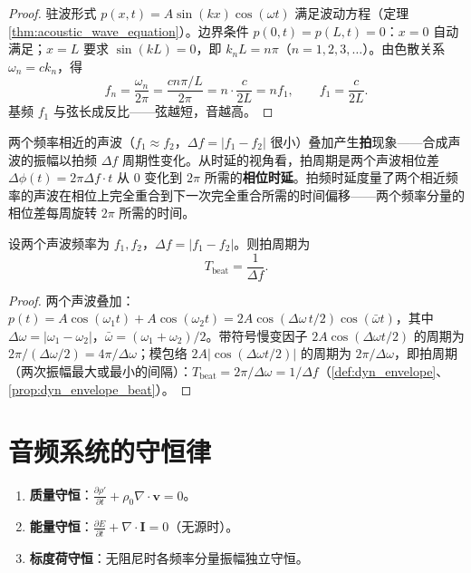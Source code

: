 \begin{proof}
驻波形式 $p(x,t) = A\sin(kx)\cos(\omega t)$ 满足波动方程（定理 \ref{thm:acoustic_wave_equation}）。边界条件 $p(0,t) = p(L,t) = 0$：$x=0$ 自动满足；$x=L$ 要求 $\sin(kL) = 0$，即 $k_n L = n\pi$（$n = 1,2,3,\dots$）。由色散关系 $\omega_n = c k_n$，得
\[
f_n = \frac{\omega_n}{2\pi} = \frac{c n\pi/L}{2\pi} = n\cdot\frac{c}{2L} = n f_1, \qquad f_1 = \frac{c}{2L}.
\]
基频 $f_1$ 与弦长成反比——弦越短，音越高。
\end{proof}

\begin{definition}[拍频时延]\label{def:beat_delay}
两个频率相近的声波（$f_1 \approx f_2$，$\Delta f = |f_1 - f_2|$ 很小）叠加产生\textbf{拍}现象——合成声波的振幅以拍频 $\Delta f$ 周期性变化。从时延的视角看，拍周期是两个声波相位差 $\Delta\phi(t) = 2\pi\Delta f \cdot t$ 从 $0$ 变化到 $2\pi$ 所需的\textbf{相位时延}。拍频时延度量了两个相近频率的声波在相位上完全重合到下一次完全重合所需的时间偏移——两个频率分量的相位差每周旋转 $2\pi$ 所需的时间。
\end{definition}

\begin{proposition}[拍频时延公式]\label{prop:beat_delay_formula}
设两个声波频率为 $f_1, f_2$，$\Delta f = |f_1 - f_2|$。则拍周期为
\[
T_{\text{beat}} = \frac{1}{\Delta f}.
\]
\end{proposition}

\begin{proof}
两个声波叠加：$p(t) = A\cos(\omega_1 t) + A\cos(\omega_2 t) = 2A\cos(\Delta\omega \, t/2)\cos(\bar{\omega} t)$，其中 $\Delta\omega = |\omega_1 - \omega_2|$，$\bar{\omega} = (\omega_1 + \omega_2)/2$。带符号慢变因子 $2A\cos(\Delta\omega t/2)$ 的周期为 $2\pi/(\Delta\omega/2)=4\pi/\Delta\omega$；模包络 $2A|\cos(\Delta\omega t/2)|$ 的周期为 $2\pi/\Delta\omega$，即拍周期（两次振幅最大或最小的间隔）：$T_{\text{beat}} = 2\pi/\Delta\omega = 1/\Delta f$（\cref{def:dyn_envelope}、\cref{prop:dyn_envelope_beat}）。
\end{proof}

\section{音频系统的守恒律}

\begin{theorem}[声波系统的三种守恒律]\label{thm:acoustic_conservation}
\begin{enumerate}[label=(\roman*)]
    \item \textbf{质量守恒}：$\frac{\partial \rho'}{\partial t} + \rho_0 \nabla \cdot \mathbf{v} = 0$。
    \item \textbf{能量守恒}：$\frac{\partial E}{\partial t} + \nabla \cdot \mathbf{I} = 0$（无源时）。
    \item \textbf{标度荷守恒}：无阻尼时各频率分量振幅独立守恒。
\end{enumerate}
\end{theorem}

